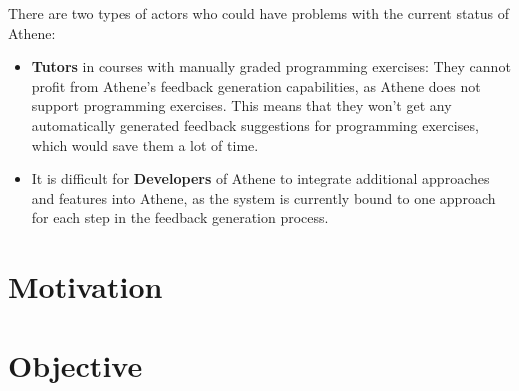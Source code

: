 There are two types of actors who could have problems with the current status of Athene:
\begin{itemize}
    \item \textbf{Tutors} in courses with manually graded programming exercises: They cannot profit from Athene's feedback generation capabilities, as Athene does not support programming exercises. This means that they won't get any automatically generated feedback suggestions for programming exercises, which would save them a lot of time.
    \item It is difficult for \textbf{Developers} of Athene to integrate additional approaches and features into Athene, as the system is currently bound to one approach for each step in the feedback generation process. 
\end{itemize}

\section*{Motivation}
        
\section*{Objective}
        

